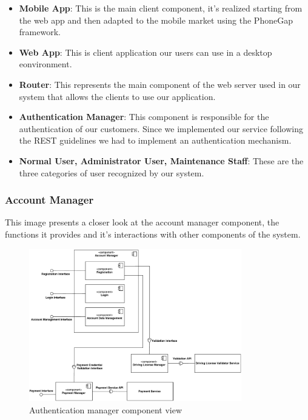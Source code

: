 \begin{itemize}
	\item \textbf{Mobile App}: This is the main client component, it's realized
														 starting from the web app and then adapted to the
														 mobile market using the PhoneGap framework.
	\item \textbf{Web App}: This is client application our users can use in a
													desktop eonvironment.
	\item \textbf{Router}: This represents the main component of the web server
												 used in our system that allows the clients to use our
												 application.
	\item \textbf{Authentication Manager}: This component is responsible for the
																				 authentication of our customers. Since
																				 we implemented our service following
																				 the REST guidelines we had to implement
																				 an authentication mechanism.
	\item \textbf{Normal User, Administrator User, Maintenance Staff}: These are
																				 the three categories of user recognized
																				 by our system.
\end{itemize}

\subsubsection{Account Manager}

This image presents a closer look at the account manager component, the
functions it provides and it's interactions with other components of the system.

\begin{figure}[H]
	\includegraphics[width=350px]{../Datas/images/AuthenticationManagerComponentView.pdf}
	\caption{Authentication manager component view}
	\label{fig:AuthenticationManagerComponentView}
\end{figure}

